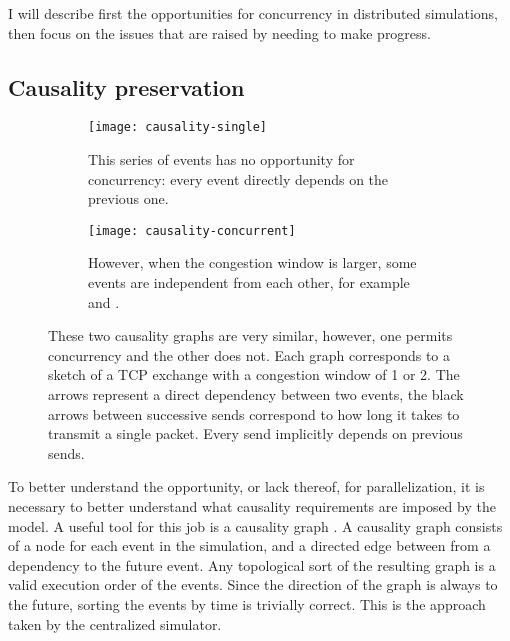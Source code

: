 I will describe first the opportunities for concurrency in distributed simulations, then focus on the issues that are raised by needing to make progress.

\subsection{Causality preservation} \label{causality}

\begin{figure}
    \centering
    \begin{subfigure}[t]{0.45\textwidth}
        \centering
        \texttt{[image: causality-single]}
        \caption{
            This series of events has no opportunity for concurrency: every event directly depends on the previous one.
        }
        \label{causality-graph-seq:fig}
    \end{subfigure}
    \begin{subfigure}[t]{0.45\textwidth}
        \centering
        \texttt{[image: causality-concurrent]}
        \caption{
            However, when the congestion window is larger, some events are independent from each other, for example  and .
        }
        \label{causality-graph-para:fig}
    \end{subfigure}
    \caption{
        These two causality graphs are very similar, however, one permits concurrency and the other does not.
        Each graph corresponds to a sketch of a TCP exchange with a congestion window of 1 or 2.
        The arrows represent a direct dependency between two events, the black arrows between successive sends correspond to how long it takes to transmit a single packet.
        Every send implicitly depends on previous sends.
    }
    \label{causality-graph:fig}
\end{figure}

To better understand the opportunity, or lack thereof, for parallelization, it is necessary to better understand what causality requirements are imposed by the model.
A useful tool for this job is a causality graph \cite{misra_distributed_1986}.
A causality graph consists of a node for each event in the simulation, and a directed edge between from a dependency to the future event.
Any topological sort of the resulting graph is a valid execution order of the events.
Since the direction of the graph is always to the future, sorting the events by time is trivially correct.
This is the approach taken by the centralized simulator.

